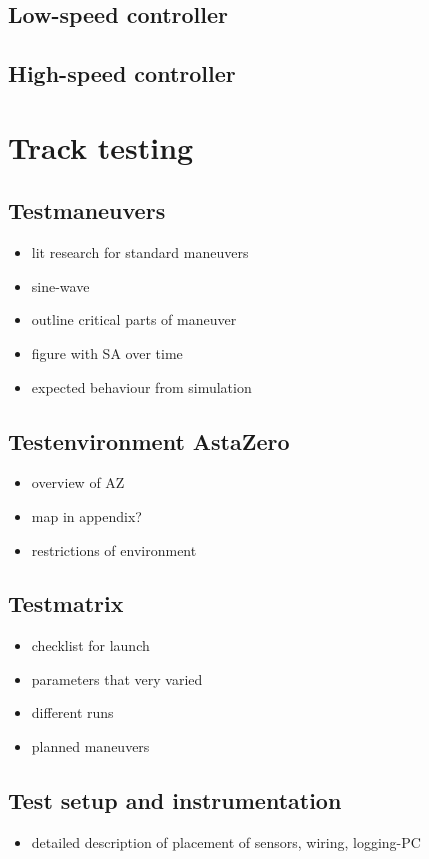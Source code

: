 \documentclass[ExampleMasters.tex]{subfiles}
\begin{document}
\subsection{Low-speed controller}
\subsection{High-speed controller}

\section{Track testing}
\label{sec:track-testing}

\subsection{Testmaneuvers}

\begin{itemize}
	\item lit research for standard maneuvers
	\item sine-wave
	\item outline critical parts of maneuver
	\item figure with SA over time
	\item expected behaviour from simulation
\end{itemize}

\subsection{Testenvironment AstaZero}

\begin{itemize}
	\item overview of AZ
	\item map in appendix?
	\item restrictions of environment
	
\end{itemize}

\subsection{Testmatrix}

\begin{itemize}
	\item checklist for launch
	\item parameters that very varied
	\item different runs
	\item planned maneuvers
	
\end{itemize}

\subsection{Test setup and instrumentation}

\begin{itemize}
	\item detailed description of placement of sensors, wiring, logging-PC
\end{itemize}
\end{document}
